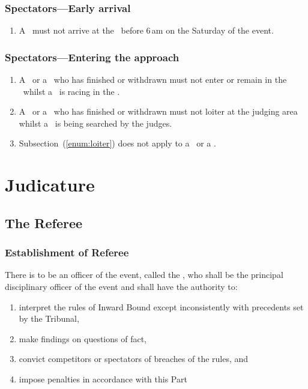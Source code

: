 \documentclass[12pt]{report}
\begin{document}
  \section{Spectators---Early arrival}
  \begin{enumerate}
    \item[] A \spectator\ must not arrive at the \Endpoint\ before 6\,am on the Saturday of the event.

  \end{enumerate}
  \section{Spectators---Entering the approach}
  \begin{enumerate}
    \item A \spectator\ or a \competitor\ who has finished or withdrawn must not enter or remain in the \approach\ whilst a \team\ is  racing  in the \approach.

    \item A \spectator\ or a \competitor\ who has finished or withdrawn must not loiter at the judging area whilst a \team\ is being searched by the judges.\label{enum:loiter}

    \item Subsection~\thesection(\ref{enum:loiter}) does not apply to a \Captain\ or a \President.
  \end{enumerate}
  \part{Judicature}
  \chapter{The Referee}
  \section{Establishment of Referee}
  \begin{fenumerate}
    \item There is to be an officer of the event, called the , who shall be the principal disciplinary officer of the event and shall have the authority to:
    \begin{enumerate}
      \item interpret the rules of Inward Bound except inconsistently with precedents set by the Tribunal,
      \item make findings on questions of fact,
      \item convict competitors or spectators of breaches of the rules, and
      \item impose penalties in accordance with this Part
    \end{enumerate}
  \end{fenumerate}
\end{document}
